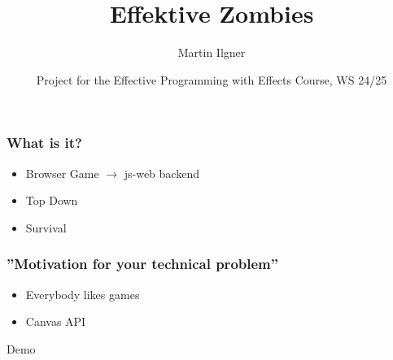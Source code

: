 \documentclass{beamer}
\title{Effektive Zombies}
\author{Martin Ilgner}
\institute{University of Tübingen}
\date{Project for the Effective Programming with Effects Course, WS 24/25}
\begin{document}
	
	
	
	\frame{\titlepage}
	
	\begin{frame}
		\frametitle{What is it?}
		\begin{Large}
		\begin{itemize}
			\setlength{\itemsep}{.5em}
			\item Browser Game $\rightarrow$ js-web backend
			\item Top Down 
			\item Survival
		\end{itemize}
		\end{Large}
	\end{frame}
	
	\begin{frame}
		\frametitle{''Motivation for your technical problem''}
		\begin{Large}
		\begin{itemize}
			\setlength{\itemsep}{1em}
			\item Everybody likes games
			\item Canvas API
		\end{itemize}
		\end{Large}
	\end{frame}
	
	\begin{frame}[plain, c]
		\begin{center}
			\Huge Demo
		\end{center}
	\end{frame}
	
\end{document}
